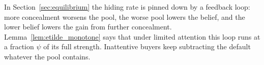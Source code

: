 In Section~\ref{sec:equilibrium} the hiding rate is pinned down by a feedback loop: more concealment worsens the pool, the worse pool lowers the belief, and the lower belief lowers the gain from further concealment. Lemma~\ref{lem:etilde_monotone} says that under limited attention this loop runs at a fraction $\psi$ of its full strength. Inattentive buyers keep subtracting the default whatever the pool contains.
